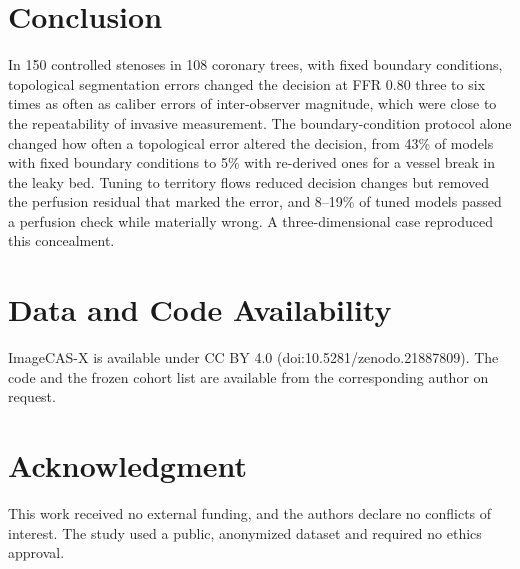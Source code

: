 \documentclass[journal]{IEEEtran}
\begin{document}
\section{Conclusion}
In 150 controlled stenoses in 108 coronary trees, with fixed boundary conditions, topological segmentation errors
changed the decision at FFR 0.80 three to six times as often as caliber errors of inter-observer magnitude, which
were close to the repeatability of invasive measurement. The boundary-condition protocol alone changed how often a topological error altered the decision, from 43\% of
models with fixed boundary conditions to 5\% with re-derived ones for a vessel break in the leaky bed. Tuning to
territory flows reduced decision changes but removed the perfusion residual that marked the error, and 8--19\% of
tuned models passed a perfusion check while materially wrong. A three-dimensional case reproduced this concealment.

\section*{Data and Code Availability}
ImageCAS-X is available under CC BY 4.0 (doi:10.5281/zenodo.21887809). The code and the frozen cohort list are
available from the corresponding author on request.

\section*{Acknowledgment}
This work received no external funding, and the authors declare no conflicts of interest. The study used a public, anonymized dataset and required no ethics
approval.



\end{document}
